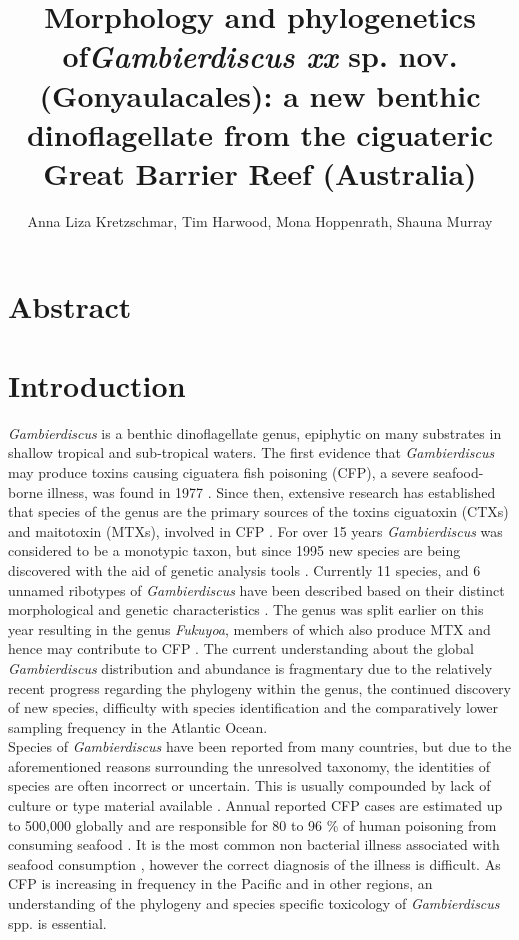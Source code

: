 \documentclass[12pt]{article}
\title{\textbf{ Morphology and phylogenetics of\emph{Gambierdiscus xx} sp. nov. (Gonyaulacales): a new benthic dinoflagellate from the ciguateric Great Barrier Reef (Australia)}}
\author{Anna Liza Kretzschmar, Tim Harwood, Mona Hoppenrath, Shauna Murray}
\date{}
\begin{document}
\maketitle

\section{Abstract}

\section{Introduction}

\emph{Gambierdiscus} is a benthic dinoflagellate genus, epiphytic on many substrates in shallow tropical and sub-tropical waters. The first evidence that \emph{Gambierdiscus} may produce toxins causing ciguatera fish poisoning (CFP), a severe seafood-borne illness, was found in 1977 \cite{yasumoto1977finding}.  
Since then, extensive research has established that species of the genus are the primary sources of the toxins ciguatoxin (CTXs) and maitotoxin (MTXs), involved in CFP \cite{chinain1997intraspecific,holmes1998gambierdiscus}.  
For over 15 years \emph{Gambierdiscus} was considered to be a monotypic taxon, but since 1995 new species are being discovered with the aid of genetic analysis tools \cite{faust1995observation,holmes1998gambierdiscus,litaker2009taxonomy,chinain1999morphology,fraga2011gambierdiscus,nishimura2014morphology}.
Currently 11 species, and 6 unnamed ribotypes of \emph{Gambierdiscus} have been described based on their distinct morphological and genetic characteristics \cite{faust1995observation,chinain1999morphology,litaker2009taxonomy,nishimura2014morphology,fraga2014genus,adachi1979thecal,litaker2010global,nishimura2013genetic,kuno2010genetic,xu2014distribution}.
The genus was split earlier on this year resulting in the genus \emph{Fukuyoa}, members of which also produce MTX and hence may contribute to CFP \cite{kohli2014feeding}.
The current understanding about the global \emph{Gambierdiscus} distribution and abundance is fragmentary due to the relatively recent progress regarding the phylogeny within the genus, the continued discovery of new species, difficulty with species identification and the comparatively lower sampling frequency in the Atlantic Ocean. \\
Species of \emph{Gambierdiscus} have been reported from many countries, but due to the aforementioned reasons surrounding the unresolved taxonomy, the identities of species are often incorrect or uncertain. This is usually compounded by lack of culture or type material available \cite{marine2014}.
Annual reported CFP cases are estimated up to 500,000 globally and are responsible for 80 to 96 \% of human poisoning from consuming seafood \cite{fleming1998seafood,grandjean2008centers}. It is the most common non bacterial illness associated with seafood consumption \cite{friedman2008ciguatera}, however the correct diagnosis of the illness is difficult. As CFP is increasing in frequency in the Pacific \cite{skinner2011ciguatera} and in other regions, an understanding of the phylogeny and species specific toxicology of \emph{Gambierdiscus} spp. is essential.
\end{document}
